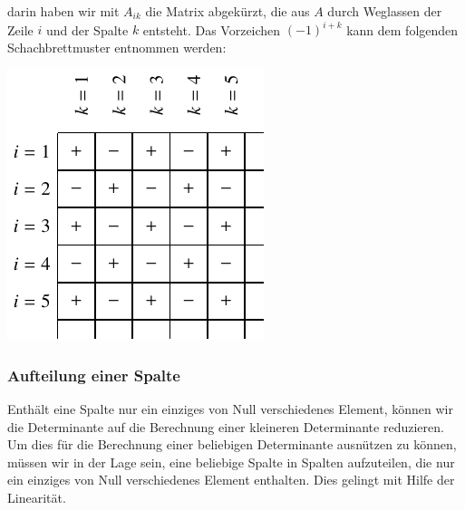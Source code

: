 darin haben wir mit $A_{ik}$ die Matrix abgekürzt, die aus $A$ durch
Weglassen der Zeile $i$ und der Spalte $k$ entsteht.
Das Vorzeichen $(-1)^{i+k}$ kann dem folgenden Schachbrettmuster
entnommen werden:
\begin{center}
\includegraphics{2/images/schachbrett.pdf}
\end{center}

\subsubsection{Aufteilung einer Spalte}
Enthält eine Spalte nur ein einziges von Null verschiedenes Element,
können wir die Determinante auf die Berechnung einer kleineren
Determinante reduzieren.
Um dies für die Berechnung einer beliebigen Determinante ausnützen
zu können, müssen wir in der Lage sein, eine beliebige Spalte in Spalten
aufzuteilen, die nur ein einziges von Null verschiedenes Element
enthalten.
Dies gelingt mit Hilfe der Linearität.

